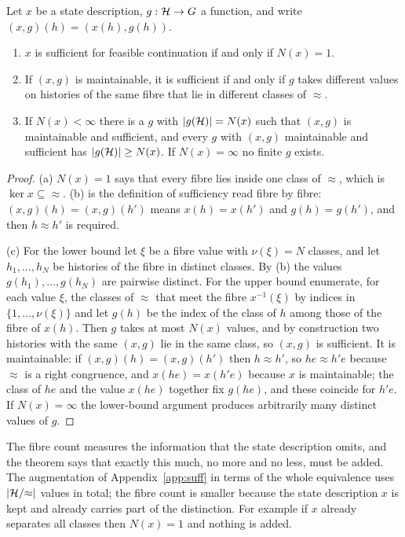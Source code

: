 \begin{newresult}[Augmentation]\label{thm:augment}
Let $x$ be a state description, $g:\mathcal{H}\to G$ a function, and write $(x,g)(h)=(x(h),g(h))$.
\begin{enumerate}[nosep,label=(\alph*)]
  \item $x$ is sufficient for feasible continuation if and only if $N(x)=1$.
  \item If $(x,g)$ is maintainable, it is sufficient if and only if $g$ takes different values on histories of the same fibre that lie in different classes of $\approx$.
  \item If $N(x)<\infty$ there is a $g$ with $|g(\mathcal{H})|=N(x)$ such that $(x,g)$ is maintainable and sufficient, and every $g$ with $(x,g)$ maintainable and sufficient has $|g(\mathcal{H})|\ge N(x)$. If $N(x)=\infty$ no finite $g$ exists.
\end{enumerate}
\end{newresult}
\begin{proof}
(a) $N(x)=1$ says that every fibre lies inside one class of $\approx$, which is $\ker x\subseteq{\approx}$. (b) is the definition of sufficiency read fibre by fibre: $(x,g)(h)=(x,g)(h')$ means $x(h)=x(h')$ and $g(h)=g(h')$, and then $h\approx h'$ is required.

(c) For the lower bound let $\xi$ be a fibre value with $\nu(\xi)=N$ classes, and let $h_1,\dots,h_N$ be histories of the fibre in distinct classes. By (b) the values $g(h_1),\dots,g(h_N)$ are pairwise distinct. For the upper bound enumerate, for each value $\xi$, the classes of $\approx$ that meet the fibre $x^{-1}(\xi)$ by indices in $\{1,\dots,\nu(\xi)\}$ and let $g(h)$ be the index of the class of $h$ among those of the fibre of $x(h)$. Then $g$ takes at most $N(x)$ values, and by construction two histories with the same $(x,g)$ lie in the same class, so $(x,g)$ is sufficient. It is maintainable: if $(x,g)(h)=(x,g)(h')$ then $h\approx h'$, so $he\approx h'e$ because $\approx$ is a right congruence, and $x(he)=x(h'e)$ because $x$ is maintainable; the class of $he$ and the value $x(he)$ together fix $g(he)$, and these coincide for $h'e$. If $N(x)=\infty$ the lower-bound argument produces arbitrarily many distinct values of $g$.
\end{proof}

The fibre count measures the information that the state description omits, and the theorem says that exactly this much, no more and no less, must be added. The augmentation of Appendix~\ref{app:suff} in terms of the whole equivalence uses $|\mathcal{H}/{\approx}|$ values in total; the fibre count is smaller because the state description $x$ is kept and already carries part of the distinction. For example if $x$ already separates all classes then $N(x)=1$ and nothing is added.

